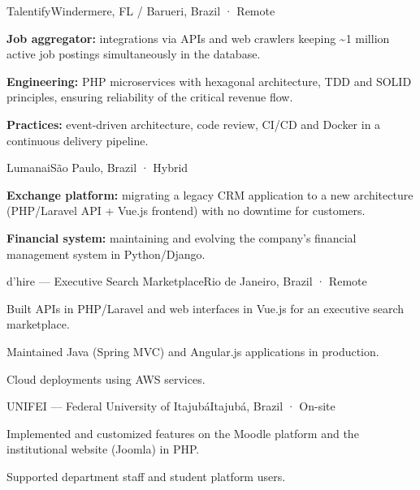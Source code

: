 \documentclass{resume}
\begin{document}
        {Talentify}{Windermere, FL / Barueri, Brazil · Remote}
\begin{cvitems}
  \item \textbf{Job aggregator:} integrations via APIs and web crawlers keeping
        \textasciitilde1 million active job postings simultaneously in the database.
  \item \textbf{Engineering:} PHP microservices with hexagonal architecture, TDD and
        SOLID principles, ensuring reliability of the critical revenue flow.
  \item \textbf{Practices:} event-driven architecture, code review, CI/CD and Docker in a
        continuous delivery pipeline.
\end{cvitems}

        {Lumanai}{São Paulo, Brazil · Hybrid}
\begin{cvitems}
  \item \textbf{Exchange platform:} migrating a legacy CRM application to a new
        architecture (PHP/Laravel API + Vue.js frontend) with no downtime for customers.
  \item \textbf{Financial system:} maintaining and evolving the company's financial
        management system in Python/Django.
\end{cvitems}

        {d'hire — Executive Search Marketplace}{Rio de Janeiro, Brazil · Remote}
\begin{cvitems}
  \item Built APIs in PHP/Laravel and web interfaces in Vue.js for an executive search
        marketplace.
  \item Maintained Java (Spring MVC) and Angular.js applications in production.
  \item Cloud deployments using AWS services.
\end{cvitems}

        {UNIFEI — Federal University of Itajubá}{Itajubá, Brazil · On-site}
\begin{cvitems}
  \item Implemented and customized features on the Moodle platform and the institutional
        website (Joomla) in PHP.
  \item Supported department staff and student platform users.
\end{cvitems}
\end{document}
